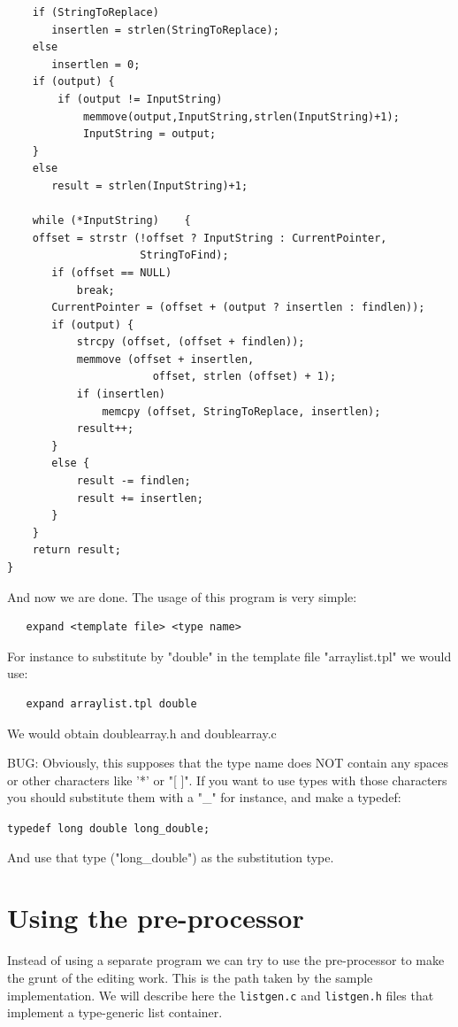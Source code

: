 \documentclass[12pt,a4paper]{memoir} %
\begin{document}
{{\begin{verbatim}
    if (StringToReplace)
       insertlen = strlen(StringToReplace);
    else
       insertlen = 0;
    if (output) {
        if (output != InputString)
            memmove(output,InputString,strlen(InputString)+1);
            InputString = output;
    }
    else
       result = strlen(InputString)+1;

    while (*InputString)    {
    offset = strstr (!offset ? InputString : CurrentPointer,
                     StringToFind);
       if (offset == NULL)
           break;
       CurrentPointer = (offset + (output ? insertlen : findlen));
       if (output) {
           strcpy (offset, (offset + findlen));
           memmove (offset + insertlen,
                       offset, strlen (offset) + 1);
           if (insertlen)
               memcpy (offset, StringToReplace, insertlen);
           result++;
       }
       else {
           result -= findlen;
           result += insertlen;
       }
    }
    return result;
}
\end{verbatim}

And now we are done. The usage of this program is very simple:
 \begin{verbatim}
   expand <template file> <type name>
\end{verbatim}

For instance to substitute by "double" in the template file "arraylist.tpl" we would use:

\begin{verbatim}
   expand arraylist.tpl double
\end{verbatim}

We would obtain doublearray.h and doublearray.c

BUG: Obviously, this supposes that the type name does NOT contain  any spaces or other characters like '*' or "[  ]". If you want to use types with 
those characters you should substitute them with a "\_" for instance, and make a typedef:

\texttt{typedef long double long\_double;}

And use that type ("long\_double") as the substitution type.
\section{Using the pre-processor}
Instead of using a separate program we can try to use the pre-processor to make the grunt of the editing work. This is the path taken by the
sample implementation. We will describe here the \verb,listgen.c, and \verb,listgen.h, files that implement a type-generic list container.

}}
\end{document}
